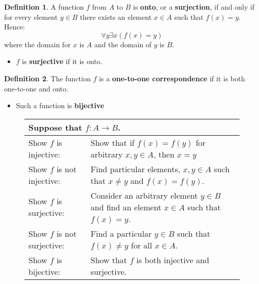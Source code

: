 \documentclass[article, 11pt]{article}
\theoremstyle{definition}
\newtheorem{definition}{Definition}[subsubsection]
\begin{document}
    \begin{definition}
        A function $f$ from $A$ to $B$ is \textbf{onto}, or a \textbf{surjection}, if and only if for every element $y \in B$ there exists an element $x \in A$ such that $f(x) = y$. Hence:
        \begin{equation*}
            \forall y \exists x (f(x) = y)
        \end{equation*}
        where the domain for $x$ is $A$ and the domain of $y$ is $B$.
        \begin{itemize}
            \item $f$ is \textbf{surjective} if it is onto.
        \end{itemize}
    \end{definition}
    \begin{definition}
        The function $f$ is a \textbf{one-to-one correspondence} if it is both one-to-one and onto. 
        \begin{itemize}
            \item Such a function is \textbf{bijective}
        \end{itemize}
        \label{def:one-to-one-correspondence}
    \end{definition}
    \begin{figure}[H]
        \centering
        {\renewcommand{\arraystretch}{1.5}
        \begin{tabular}{|l p{25em}|}
            \hline
            \multicolumn{2}{|l|}{Suppose that $f: A \to B$.} \\
            \hline
            Show $f$ is injective: & Show that if $f(x) = f(y)$ for arbitrary $x,y \in A$, then $x = y$ \\
            Show $f$ is not injective: & Find particular elements, $x,y \in A$ such that $x \neq y$ and $f(x)=f(y)$. \\
            Show $f$ is surjective: & Consider an arbitrary element $y \in B$ and find an element $x \in A$ such that $f(x) = y$. \\
            Show $f$ is not surjective: & Find a particular $y \in B$ such that $f(x) \neq y$ for all $x \in A$. \\
            Show $f$ is bijective: & Show that $f$ is both injective and surjective. \\
            \hline
        \end{tabular}}
    \end{figure}
\end{document}
